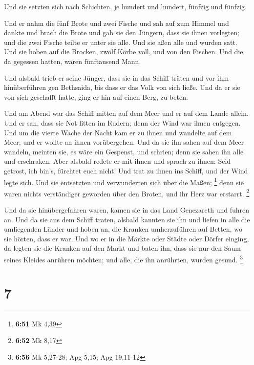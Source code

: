  Und sie setzten sich nach Schichten, je hundert und
hundert, fünfzig und fünfzig.

 Und er nahm die fünf Brote und zwei Fische und sah auf zum
Himmel und dankte und brach die Brote und gab sie den Jüngern, dass sie
ihnen vorlegten; und die zwei Fische teilte er unter sie alle.
 Und sie aßen alle und wurden satt.  Und sie
hoben auf die Brocken, zwölf Körbe voll, und von den Fischen.
 Und die da gegessen hatten, waren fünftausend Mann.

 Und alsbald trieb er seine Jünger, dass sie in das Schiff
träten und vor ihm hinüberführen gen Bethsaida, bis dass er das Volk von
sich ließe.  Und da er sie von sich geschafft hatte, ging
er hin auf einen Berg, zu beten.

 Und am Abend war das Schiff mitten auf dem Meer und er auf
dem Lande allein.  Und er sah, dass sie Not litten im
Rudern; denn der Wind war ihnen entgegen. Und um die vierte Wache der
Nacht kam er zu ihnen und wandelte auf dem Meer;  und er
wollte an ihnen vorübergehen. Und da sie ihn sahen auf dem Meer wandeln,
meinten sie, es wäre ein Gespenst, und schrien;  denn sie
sahen ihn alle und erschraken. Aber alsbald redete er mit ihnen und
sprach zu ihnen: Seid getrost, ich bin's, fürchtet euch nicht!
 Und trat zu ihnen ins Schiff, und der Wind legte sich. Und
sie entsetzten und verwunderten sich über die Maßen; \footnote{\textbf{6:51}
  Mk 4,39}  denn sie waren nichts verständiger geworden
über den Broten, und ihr Herz war erstarrt. \footnote{\textbf{6:52} Mk
  8,17}

 Und da sie hinübergefahren waren, kamen sie in das Land
Genezareth und fuhren an.  Und da sie aus dem Schiff
traten, alsbald kannten sie ihn  und liefen in alle die
umliegenden Länder und hoben an, die Kranken umherzuführen auf Betten,
wo sie hörten, dass er war.  Und wo er in die Märkte oder
Städte oder Dörfer einging, da legten sie die Kranken auf den Markt und
baten ihn, dass sie nur den Saum seines Kleides anrühren möchten; und
alle, die ihn anrührten, wurden gesund. \footnote{\textbf{6:56} Mk
  5,27-28; Apg 5,15; Apg 19,11-12}

\hypertarget{section-1}{%
\section{7}\label{section-1}}

